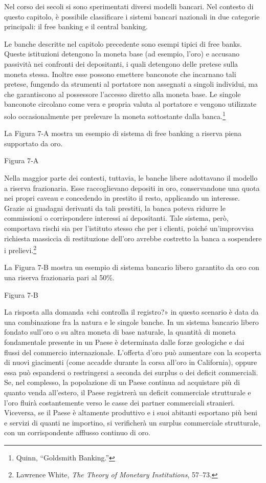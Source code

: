 \documentclass[
  a5paper,
  smalldemyvopaper,10pt,twoside,onecolumn,openright,extrafontsizes,hidelinks]{memoir}
\begin{document}
Nel corso dei secoli si sono sperimentati diversi modelli bancari. Nel
contesto di questo capitolo, è possibile classificare i sistemi bancari
nazionali in due categorie principali: il free banking e il central
banking.

Le banche descritte nel capitolo precedente sono esempi tipici di free
banks. Queste istituzioni detengono la moneta base (ad esempio, l'oro) e
accusano passività nei confronti dei depositanti, i quali detengono
delle pretese sulla moneta stessa. Inoltre esse possono emettere
banconote che incarnano tali pretese, fungendo da strumenti al portatore
non assegnati a singoli individui, ma che garantiscono al possessore
l'accesso diretto alla moneta base. Le singole banconote circolano come
vera e propria valuta al portatore e vengono utilizzate solo
occasionalmente per prelevare la moneta sottostante dalla
banca.\footnote{Quinn, ``Goldsmith Banking.''}

La Figura 7-A mostra un esempio di sistema di free banking a riserva
piena supportato da oro.

Figura 7‑A

Nella maggior parte dei contesti, tuttavia, le banche libere adottavano
il modello a riserva frazionaria. Esse raccoglievano depositi in oro,
conservandone una quota nei propri caveau e concedendo in prestito il
resto, applicando un interesse. Grazie ai guadagni derivanti da tali
prestiti, la banca poteva ridurre le commissioni o corrispondere
interessi ai depositanti. Tale sistema, però, comportava rischi sia per
l'istituto stesso che per i clienti, poiché un'improvvisa richiesta
massiccia di restituzione dell'oro avrebbe costretto la banca a
sospendere i prelievi.\footnote{Lawrence White, \emph{The Theory of
  Monetary Institutions}, 57--73.}

La Figura 7‑B mostra un esempio di sistema bancario libero garantito da
oro con una riserva frazionaria pari al 50\%.

Figura 7‑B

La risposta alla domanda «chi controlla il registro?» in questo scenario
è data da una combinazione fra la natura e le singole banche. In un
sistema bancario libero fondato sull'oro o su altra moneta di base
naturale, la quantità di moneta fondamentale presente in un Paese è
determinata dalle forze geologiche e dai flussi del commercio
internazionale. L'offerta d'oro può aumentare con la scoperta di nuovi
giacimenti (come accadde durante la corsa all'oro in California), oppure
essa può espandersi o restringersi a seconda dei surplus o dei deficit
commerciali. Se, nel complesso, la popolazione di un Paese continua ad
acquistare più di quanto venda all'estero, il Paese registrerà un
deficit commerciale strutturale e l'oro fluirà costantemente verso le
casse dei partner commerciali stranieri. Viceversa, se il Paese è
altamente produttivo e i suoi abitanti esportano più beni e servizi di
quanti ne importino, si verificherà un surplus commerciale strutturale,
con un corrispondente afflusso continuo di oro.
\end{document}
